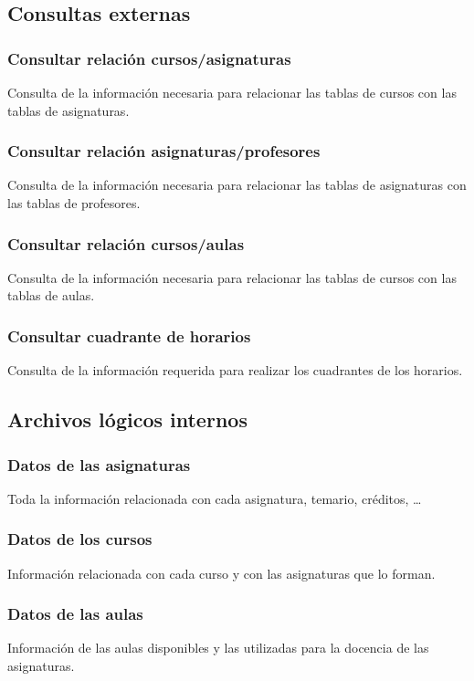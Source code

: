 \documentclass[11pt,a4paper,spanish,twoside]{book}
\begin{document}
\subsection{Consultas externas}
\subsubsection{Consultar relación cursos/asignaturas}
Consulta de la información necesaria para relacionar las tablas de
cursos con las tablas de asignaturas.

\subsubsection{Consultar relación asignaturas/profesores}
Consulta de la información necesaria para relacionar las tablas de
asignaturas con las tablas de profesores.

\subsubsection{Consultar relación cursos/aulas}
Consulta de la información necesaria para relacionar las tablas de
cursos con las tablas de aulas.

\subsubsection{Consultar cuadrante de horarios}
Consulta de la información requerida para realizar los cuadrantes de los
horarios.

\subsection{Archivos lógicos internos}
\subsubsection{Datos de las asignaturas}
Toda la información relacionada con cada asignatura, temario, créditos, \dots

\subsubsection{Datos de los cursos}
Información relacionada con cada curso y con las asignaturas que lo forman.

\subsubsection{Datos de las aulas}
Información de las aulas disponibles y las utilizadas para la docencia de las
asignaturas. 
\end{document}
